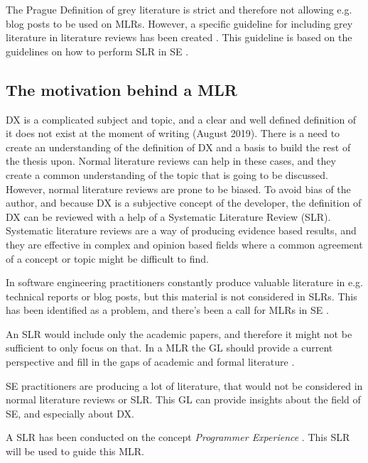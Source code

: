 \documentclass[english, 12pt, a4paper, sci, utf8, a-1b, online]{aaltothesis}
\begin{document}
The Prague Definition of grey literature is strict and therefore not allowing e.g. blog posts to be used on MLRs. However, a specific guideline for including grey literature in literature reviews has been created \cite{guidelines-for-MLR}. This guideline is based on the guidelines on how to perform SLR in SE \cite{guidelines-for-SLR-in-SE}.


\subsection{The motivation behind a MLR}

DX is a complicated subject and topic, and a clear and well defined definition of it does not exist at the moment of writing (August 2019). There is a need to create an understanding of the definition of DX and a basis to build the rest of the thesis upon. Normal literature reviews can help in these cases, and they create a common understanding of the topic that is going to be discussed. However, normal literature reviews are prone to be biased. To avoid bias of the author, and because DX is a subjective concept of the developer, the definition of DX can be reviewed with a help of a Systematic Literature Review (SLR). Systematic literature reviews are a way of producing evidence based results, and they are effective in complex and opinion based fields where a common agreement of a concept or topic might be difficult to find.

In software engineering practitioners constantly produce valuable literature in e.g. technical reports or blog posts, but this material is not considered in SLRs. This has been identified as a problem, and there's been a call for MLRs in SE \cite{the-need-for-MLR}.

An SLR would include only the academic papers, and therefore it might not be sufficient to only focus on that. In a MLR the GL should provide a current perspective and fill in the gaps of academic and formal literature \cite{guidelines-for-MLR}.

SE practitioners are producing a lot of literature, that would not be considered in normal literature reviews or SLR. This GL can provide insights about the field of SE, and especially about DX.

A SLR has been conducted on the concept \textit{Programmer Experience} \cite{programmer-experience}. This SLR will be used to guide this MLR.

\end{document}
